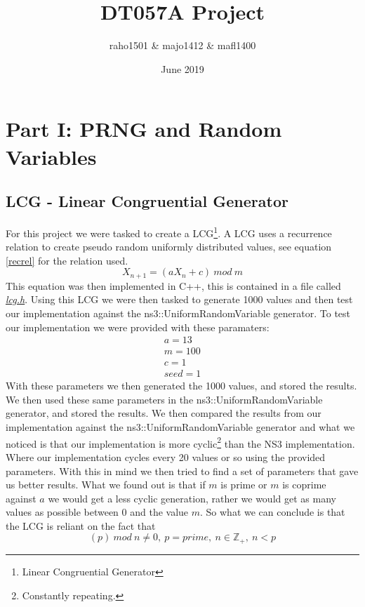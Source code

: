\documentclass{article}
\title{DT057A Project}
\author{raho1501 \& majo1412 \& mafl1400}
\date{June 2019}
\begin{document}
\maketitle

\section{Part I: PRNG and Random Variables} \label{part1}
  \subsection{LCG - Linear Congruential Generator}
    For this project we were tasked to create a LCG\footnote{Linear Congruential Generator}. 
    A LCG uses a recurrence relation to create pseudo random uniformly distributed values, see equation \ref{recrel} for the relation used.
    \begin{equation} \label{recrel}
      X_{n+1} = (aX_{n} + c)\ mod\ m
    \end{equation}
    This equation was then implemented in C++, this is contained in a file called \href{https://github.com/NoRines/simulerings_projekt/blob/master/lcg.h}{\emph{lcg.h}}.
    Using this LCG we were then tasked to generate 1000 values and then test our implementation against the ns3::UniformRandomVariable generator. 
    To test our implementation we were provided with these paramaters:
    \begin{align*}
      a=13 \\
      m=100 \\
      c=1 \\
      seed=1
    \end{align*}
    With these parameters we then generated the 1000 values, and stored the results.
    We then used these same parameters in the ns3::UniformRandomVariable generator, and stored the results.
    We then compared the results from our implementation against the ns3::UniformRandomVariable generator and what we noticed is that our implementation is more cyclic\footnote{Constantly repeating.} than the NS3 implementation. 
    Where our implementation cycles every 20 values or so using the provided parameters.
    With this in mind we then tried to find a set of parameters that gave us better results.
    What we found out is that if $m$ is prime or $m$ is coprime against $a$ we would get a less cyclic generation, rather we would get as many values as possible between 0 and the value $m$.
    So what we can conclude is that the LCG is reliant on the fact that
    \begin{equation}
      (p)\ mod\ n \neq 0,\ p = prime,\ n \in \mathbb{Z}_{+} ,\ n < p
    \end{equation}
\end{document}
